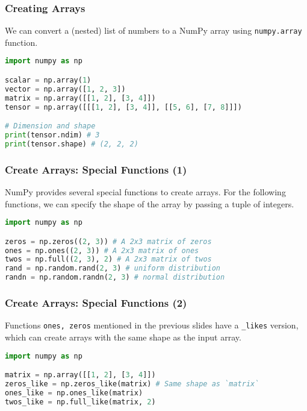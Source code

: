 \documentclass[beamer, en, version=2.0]{huangfusl-template}
\begin{document}
    \begin{frame}[fragile]
        \frametitle{Creating Arrays}

        We can convert a (nested) list of numbers to a NumPy array using {\color{blue}\footnotesize\verb|numpy.array|} function.

\begin{lstlisting}[language=python]
import numpy as np

scalar = np.array(1)
vector = np.array([1, 2, 3])
matrix = np.array([[1, 2], [3, 4]])
tensor = np.array([[[1, 2], [3, 4]], [[5, 6], [7, 8]]])

# Dimension and shape
print(tensor.ndim) # 3
print(tensor.shape) # (2, 2, 2)
\end{lstlisting}
    \end{frame}
    \begin{frame}[fragile]
        \frametitle{Create Arrays: Special Functions (1)}

        NumPy provides several special functions to create arrays. For the following functions, we can specify the shape of the array by passing a tuple of integers.

\begin{lstlisting}[language=python]
import numpy as np

zeros = np.zeros((2, 3)) # A 2x3 matrix of zeros
ones = np.ones((2, 3)) # A 2x3 matrix of ones
twos = np.full((2, 3), 2) # A 2x3 matrix of twos
rand = np.random.rand(2, 3) # uniform distribution
randn = np.random.randn(2, 3) # normal distribution
\end{lstlisting}
    \end{frame}
    \begin{frame}[fragile]
        \frametitle{Create Arrays: Special Functions (2)}

        Functions {\color{blue}\footnotesize\verb|ones, zeros|} mentioned in the previous slides have a {\footnotesize\verb|_likes|} version, which can create arrays with the same shape as the input array.

\begin{lstlisting}[language=python]
import numpy as np

matrix = np.array([[1, 2], [3, 4]])
zeros_like = np.zeros_like(matrix) # Same shape as `matrix`
ones_like = np.ones_like(matrix)
twos_like = np.full_like(matrix, 2)
\end{lstlisting}
    \end{frame}
\end{document}
